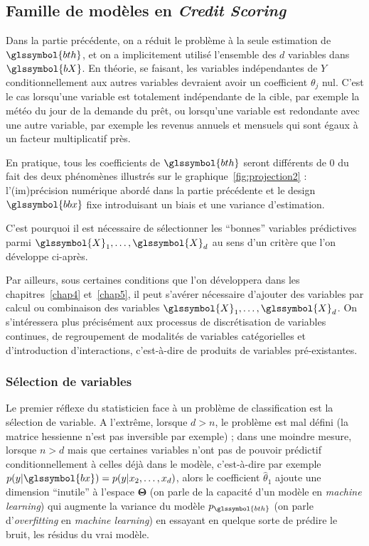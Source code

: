 \subsection{Famille de modèles en \textit{Credit Scoring}}

Dans la partie précédente, on a réduit le problème à la seule estimation de $\glssymbol{bth}$, et on a implicitement utilisé l'ensemble des $d$ variables dans $\glssymbol{bX}$. En théorie, se faisant, les variables indépendantes de $Y$ conditionnellement aux autres variables devraient avoir un coefficient $\theta_j$ nul. C'est le cas lorsqu'une variable est totalement indépendante de la cible, par exemple la météo du jour de la demande du prêt, ou lorsqu'une variable est redondante avec une autre variable, par exemple les revenus annuels et mensuels qui sont égaux à un facteur multiplicatif près.

En pratique, tous les coefficients de $\glssymbol{bth}$ seront différents de $0$ du fait des deux phénomènes illustrés sur le graphique~\ref{fig:projection2} : l'(im)précision numérique abordé dans la partie précédente et le design $\glssymbol{bbx}$ fixe introduisant un biais et une variance d'estimation.

C'est pourquoi il est nécessaire de sélectionner les ``bonnes'' variables prédictives parmi $\glssymbol{X}_1,\dots,\glssymbol{X}_d$ au sens d'un critère que l'on développe ci-après.

Par ailleurs, sous certaines conditions que l'on développera dans les chapitres~\ref{chap4} et~\ref{chap5}, il peut s'avérer nécessaire d'ajouter des variables par calcul ou combinaison des variables $\glssymbol{X}_1,\dots,\glssymbol{X}_d$. On s'intéressera plus précisément aux processus de discrétisation de variables continues, de regroupement de modalités de variables catégorielles et d'introduction d'interactions, c'est-à-dire de produits de variables pré-existantes.

\subsubsection{Sélection de variables}

Le premier réflexe du statisticien face à un problème de classification est la sélection de variable. A l'extrême, lorsque $d > n$, le problème est mal défini (la matrice hessienne n'est pas inversible par exemple) ; dans une moindre mesure, lorsque $n > d$ mais que certaines variables n'ont pas de pouvoir prédictif conditionnellement à celles déjà dans le modèle, c'est-à-dire par exemple $p(y | \glssymbol{bx}) = p(y|x_2,\dots,x_d)$, alors le coefficient $\hat{\theta}_1$ ajoute une dimension ``inutile'' à l'espace $\bm{\Theta}$ (on parle de la capacité d'un modèle en \textit{machine learning}) qui augmente la variance du modèle $p_{\glssymbol{bth}}$ (on parle d'\textit{overfitting} en \textit{machine learning}) en essayant en quelque sorte de prédire le bruit, les résidus du vrai modèle.

